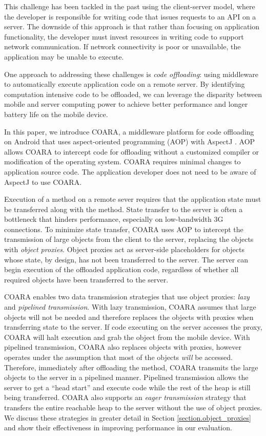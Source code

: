 \documentclass[10pt,journal,cspaper,compsoc]{IEEEtran}
\begin{document}
This challenge has been tackled in the past using the client-server model, where the developer is responsible for writing code that issues requests to an API on a server. The downside of this approach is that rather than focusing on application functionality, the developer must invest resources in writing code to support network communication.  If network connectivity is poor or unavailable, the application may be unable to execute.

One approach to addressing these challenges is \emph{code offloading}: using middleware to automatically execute application code on a remote server.  By identifying computation intensive code to be offloaded, we can leverage the disparity between mobile and server computing power to achieve better performance and longer battery life on the mobile device.

In this paper, we introduce COARA, a middleware platform for code offloading on Android that uses aspect-oriented programming (AOP) \cite{AOP_Paper:1997vp} with AspectJ \cite{aspectj:Online}.  AOP allows COARA to intercept code for offloading without a customized compiler or modification of the operating system.  COARA requires minimal changes to application source code.  The application developer does not need to be aware of AspectJ to use COARA.


Execution of a method on a remote sever requires that the application state must be transferred along with the method. State transfer to the server is often a bottleneck that hinders performance, especially on low-bandwidth 3G connections.  To minimize state transfer, COARA uses AOP to intercept the transmission of large objects from the client to the server, replacing the objects with \emph{object proxies}.  Object proxies act as server-side placeholders for objects whose state, by design, has not been transferred to the server. The server can begin execution of the offloaded application code, regardless of whether all required objects have been transferred to the server.

COARA enables two data transmission strategies that use object proxies: \emph{lazy} and \emph{pipelined transmission}. With lazy transmission, COARA assumes that large objects will not be needed and therefore replaces the objects with proxies when transferring state to the server.  If code executing on the server accesses the proxy, COARA will halt execution and grab the object from the mobile device.  With pipelined transmission, COARA also replaces objects with proxies, however operates under the assumption that most of the objects \emph{will} be accessed.  Therefore, immediately after offloading the method, COARA transmits the large objects to the server in a pipelined manner.  Pipelined transmission allows the server to get a ``head start'' and execute code while the rest of the heap is still being transferred.  COARA also supports an \emph{eager transmission} strategy that transfers the entire reachable heap to the server without the use of object proxies. We discuss these strategies in greater detail in Section \ref{section.object_proxies} and show their effectiveness in improving performance in our evaluation.
\end{document}
